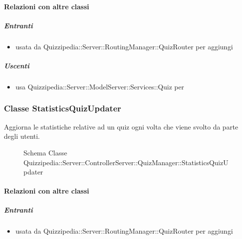 \paragraph{Relazioni con altre classi}
\subparagraph{Entranti}
\begin{itemize}
\item usata da Quizzipedia::Server::RoutingManager::QuizRouter per aggiungi
\end{itemize}
\subparagraph{Uscenti}
\begin{itemize}
\item usa Quizzipedia::Server::ModelServer::Services::Quiz per 
\end{itemize}
\subsubsection{Classe StatisticsQuizUpdater}
Aggiorna le statistiche relative ad un quiz ogni volta che viene svolto da parte degli utenti.
\begin{figure}[H]
\centering
\noindent{}
\caption[Schema Classe StatisticsQuizUpdater]{Schema Classe Quizzipedia::Server::ControllerServer::QuizManager::StatisticsQuizUpdater}
\end{figure}
\paragraph{Relazioni con altre classi}
\subparagraph{Entranti}
\begin{itemize}
\item usata da Quizzipedia::Server::RoutingManager::QuizRouter per aggiungi
\end{itemize}
